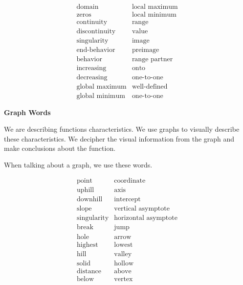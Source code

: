 \documentclass{ximera}
\begin{document}
\[
\begin{array}{ll}
\text{domain}  & \text{local maximum}  \\
\text{zeros}  & \text{local minimum} \\
\text{continuity}    &  \text{range} \\
\text{discontinuity}  & \text{value} \\
\text{singularity}   & \text{image} \\
\text{end-behavior} & \text{preimage} \\
\text{behavior} & \text{range partner} \\
\text{increasing} & \text{onto} \\
\text{decreasing} &  \text{one-to-one} \\
\text{global maximum} &  \text{well-defined} \\
\text{global minimum} &  \text{one-to-one} 

\end{array}
\]













\textbf{\textcolor{red!75!green}{Graph Words}}

We are describing functions characteristics. We use graphs to visually describe these characteristics.  We decipher the visual information from the graph and make conclusions about the function.

When talking about a graph, we use these words.


\[
\begin{array}{ll}
\text{point}  & \text{coordinate}  \\
\text{uphill}  & \text{axis} \\
\text{downhill}    &  \text{intercept} \\
\text{slope}  & \text{vertical asymptote} \\
\text{singularity}   & \text{horizontal asymptote} \\
\text{break} & \text{jump} \\
\text{hole} & \text{arrow} \\
\text{highest} & \text{lowest} \\
\text{hill} &  \text{valley} \\ 
\text{solid} &  \text{hollow} \\
\text{distance} &  \text{above}  \\
\text{below} &  \text{vertex} 
\end{array}
\]
\end{document}
